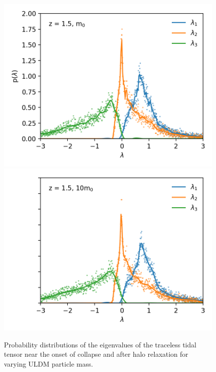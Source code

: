 \documentclass[a4paper,11pt]{article}
\begin{document}
\begin{figure}[!htb]
  \includegraphics[trim={1cm 0 0 1cm},scale=0.8]{distro_single_light_107.png}
\endminipage\hfill
{}%
  \includegraphics[trim={1cm 0 0 1cm},scale=0.8]{distro_single_mid_107.png}
\endminipage
\caption{Probability distributions of the eigenvalues of the traceless tidal tensor near the onset of collapse and after halo relaxation for varying ULDM particle mass. }\label{fig:singles_distros}
\end{figure}
\end{document}
